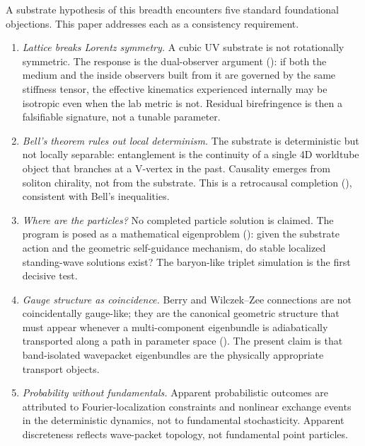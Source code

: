 A substrate hypothesis of this breadth encounters five standard foundational objections.
This paper addresses each as a consistency requirement.

\begin{enumerate}
\item \emph{Lattice breaks Lorentz symmetry.}
A cubic UV substrate is not rotationally symmetric.
The response is the dual-observer argument (): if both the medium and the inside observers built from it are governed by the same stiffness tensor, the effective kinematics experienced internally may be isotropic even when the lab metric is not.
Residual birefringence is then a falsifiable signature, not a tunable parameter.

\item \emph{Bell's theorem rules out local determinism.}
The substrate is deterministic but not locally separable: entanglement is the continuity of a single 4D worldtube object that branches at a V-vertex in the past.
Causality emerges from soliton chirality, not from the substrate.
This is a retrocausal completion (), consistent with Bell's inequalities.

\item \emph{Where are the particles?}
No completed particle solution is claimed.
The program is posed as a mathematical eigenproblem (): given the substrate action and the geometric self-guidance mechanism, do stable localized standing-wave solutions exist?
The baryon-like triplet simulation is the first decisive test.

\item \emph{Gauge structure as coincidence.}
Berry and Wilczek--Zee connections are not coincidentally gauge-like; they are the canonical geometric structure that must appear whenever a multi-component eigenbundle is adiabatically transported along a path in parameter space ().
The present claim is that band-isolated wavepacket eigenbundles are the physically appropriate transport objects.

\item \emph{Probability without fundamentals.}
Apparent probabilistic outcomes are attributed to Fourier-localization constraints and nonlinear exchange events in the deterministic dynamics, not to fundamental stochasticity.
Apparent discreteness reflects wave-packet topology, not fundamental point particles.
\end{enumerate}

